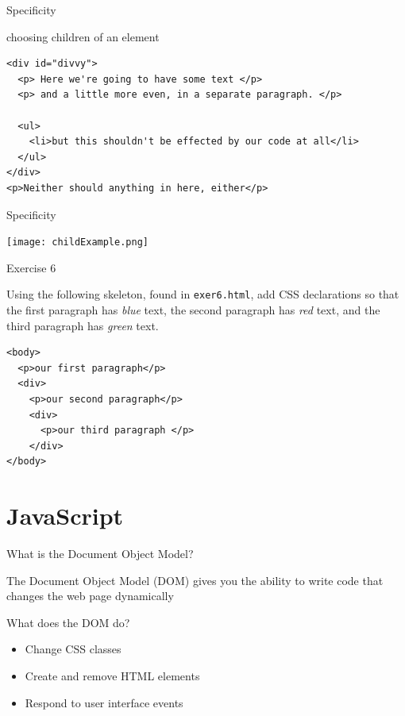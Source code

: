 \documentclass{beamer}
\begin{document}
\begin{frame}[fragile]{Specificity}
 \begin{block}{choosing children of an element}
\begin{verbatim}
<div id="divvy">
  <p> Here we're going to have some text </p>
  <p> and a little more even, in a separate paragraph. </p>

  <ul>
    <li>but this shouldn't be effected by our code at all</li>
  </ul>
</div>
<p>Neither should anything in here, either</p>
\end{verbatim}
\end{block}
\end{frame}
\begin{frame}[label={sec:orgheadline46}]{Specificity}
\begin{block}{}
\texttt{[image: childExample.png]}
\end{block}
\end{frame}
\begin{frame}[fragile,label={sec:orgheadline47}]{Exercise 6}
 \begin{block}{}
{\large
Using the following skeleton, found in \texttt{exer6.html}, add CSS declarations so that the first paragraph has \emph{blue} text, the second paragraph has \emph{red} text, and the third paragraph has \emph{green} text.
}
\end{block}
\begin{block}{}
\begin{verbatim}
<body>
  <p>our first paragraph</p>
  <div>
    <p>our second paragraph</p>
    <div>
      <p>our third paragraph </p>
    </div>
</body>
\end{verbatim}
\end{block}
\end{frame}


\section{JavaScript}

\begin{frame}{What is the Document Object Model?}
  \begin{block}{}
    The Document Object Model (DOM) gives you the ability to write \alert<2>{code} that changes the \alert<3>{web page} \alert<4>{dynamically} 
  \end{block}
\end{frame}

\begin{frame}{What does the DOM do?}
  \begin{block}{}
    \begin{itemize}
    \item Change CSS classes \pause
    \item Create and remove HTML elements \pause
    \item Respond to user interface \alert<4>{events}
    \end{itemize}
  \end{block}
\end{frame}
\end{document}
